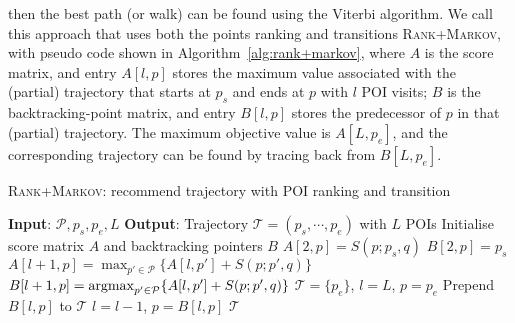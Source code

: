then the best path (or walk) can be found using the Viterbi algorithm.
We call this approach that uses both the points ranking and transitions \textsc{Rank+Markov},
with pseudo code shown in Algorithm~\ref{alg:rank+markov},
where $A$ is the score matrix, and entry $A[l, p]$ stores the maximum value associated with the (partial) trajectory
that starts at $p_s$ and ends at $p$ with $l$ POI visits;
$B$ is the backtracking-point matrix, and entry $B[l, p]$ stores the predecessor of $p$ in that (partial) trajectory.
The maximum objective value is $A[L, p_e]$,
and the corresponding trajectory can be found by tracing back from $B[L, p_e]$.

\setlength{\textfloatsep}{0.5em} %

\begin{algorithm}[t]
\caption{\textsc{Rank+Markov}: recommend trajectory with POI ranking and transition}
\label{alg:rank+markov}
\begin{algorithmic}[1]
\STATE \textbf{Input}: $\mathcal{P}, p_s, p_e, L$
\STATE \textbf{Output}: Trajectory $\mathcal{T} = (p_s, \cdots, p_e)$ with $L$ POIs
\STATE Initialise score matrix $A$ and backtracking pointers $B$
    \STATE $A[2, p] = S(p; p_s, q)$
    \STATE $B[2, p] = p_s$
\ENDFOR
{}
        \STATE $A[l+1, p]   = \max_{p' \in \mathcal{P}} \{ A[l, p'] + S(p; p', q) \}$ \label{eq:max}
        \STATE $B[l+1, p]   = \operatorname*{argmax}_{p' \in \mathcal{P}} \{ A[l, p'] + S(p; p', q) \}$ \label{eq:argmax}
    \ENDFOR
\ENDFOR
\STATE $\mathcal{T}= \{p_e\}$, $l = L$, $p = p_e$
\REPEAT
    \STATE Prepend $B[l, p]$ to $\mathcal{T}$
    \STATE $l = l - 1$, $p = B[l, p]$
\RETURN $\mathcal{T}$
\end{algorithmic}
\end{algorithm}



